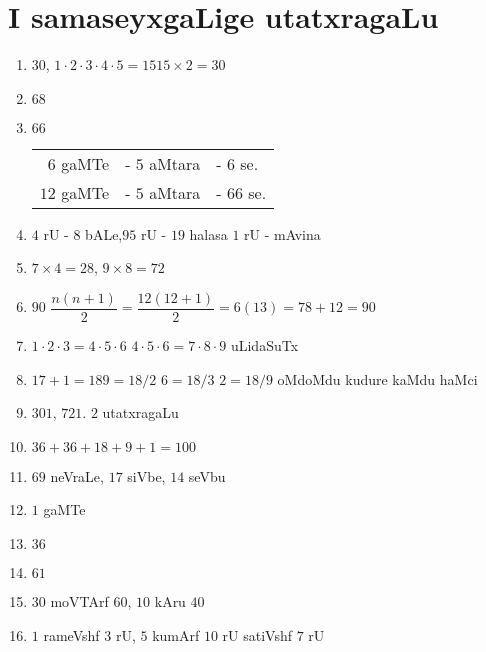 \chapter{I samaseyxgaLige utatxragaLu}

\begin{enumerate}
 \renewcommand{\labelenumi}{\rm(\theenumi)}
\item $30$, \qquad $1 \cdot 2 \cdot 3 \cdot 4 \cdot 5 = 15$\qquad  $15 \times 2 =30$

\item $68$

\item $66$ \qquad \begin{tabular}[t]{rrl}
  $6$ gaMTe&  - $5$ aMtara & - $6$ se.\\
  $12$ gaMTe & - $5$ aMtara & - $66$ se.
\end{tabular}

\item $4$ rU - $8$ bALe,\qquad  $95$ rU - $19$ halasa \qquad  $1$ rU - mAvina

\item $7 \times 4 = 28$, \qquad $9 \times 8 = 72$

\item $90$ \qquad $\dfrac{n(n+1)}{2} = \dfrac{12(12+1)}{2} = 6(13) = 78 +12 = 90$

\item $1 \cdot 2 \cdot  3 = 4 \cdot  5 \cdot 6$ \qquad $4\cdot 5\cdot 6=7\cdot 8\cdot 9$ uLidaSuTx

\item $17+1 =18$\quad $9 =18/2$ \quad $6=18/3$ \quad $2 = 18/9$ oMdoMdu kudure kaMdu haMci

\item $301$, $721$. $2$ utatxragaLu
  
\item $36+36+18+9+1 = 100$

\item $69$ neVraLe, $17$ siVbe, $14$ seVbu

\item $1$ gaMTe

\item $36$

\item $61$

\item $30$ moVTArf $60$, $10$ kAru $40$

\item $1$ rameVshf $3$ rU, $5$ kumArf $10$ rU satiVshf $7$ rU


\end{enumerate}
